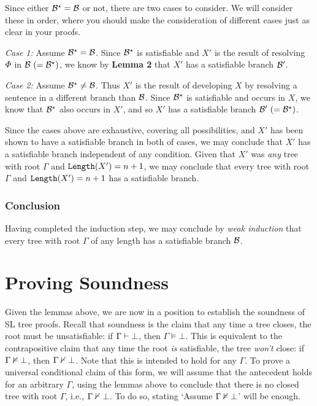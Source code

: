 Since either $\mathcal{B}^\star=\mathcal{B}$ or not, there are two cases to consider.
We will consider these in order, where you should make the consideration of different cases just as clear in your proofs.

\textit{Case 1:} 
  Assume $\mathcal{B}^\star=\mathcal{B}$.
  Since $\mathcal{B}^\star$ is satisfiable and $X'$ is the result of resolving $\varPhi$ in $\mathcal{B}\ (=\mathcal{B}^\star)$, we know by \textbf{Lemma 2} that $X'$ has a satisfiable branch $\mathcal{B}'$. 

\textit{Case 2:} 
  Assume $\mathcal{B}^\star\neq\mathcal{B}$.
  Thus $X'$ is the result of developing $X$ by resolving a sentence in a different branch than $\mathcal{B}$.
  Since $\mathcal{B}^\star$ is satisfiable and occurs in $X$, we know that $\mathcal{B}^\star$ also occurs in $X'$, and so $X'$ has a satisfiable branch $\B'\ (=\B^\star)$.
  
Since the cases above are exhaustive, covering all possibilities, and $X'$ has been shown to have a satisfiable branch in both of cases, we may conclude that $X'$ has a satisfiable branch independent of any condition. 
Given that $X'$ was \textit{any} tree with root $\Gamma$ and $\texttt{Length}(X')=n+1$, we may conclude that every tree with root $\Gamma$ and $\texttt{Length}(X')=n+1$ has a satisfiable branch. 



\subsubsection{Conclusion}

Having completed the induction step, we may conclude by \textit{weak induction} that every tree with root $\Gamma$ of any length has a satisfiable branch $\mathcal{B}$. 


\section{Proving Soundness}

Given the lemmas above, we are now in a position to establish the soundness of SL tree proofs.
Recall that soundness is the claim that any time a tree closes, the root must be unsatisfiable: if $\Gamma \vdash \bot$, then $\Gamma \models \bot$.
This is equivalent to the contrapositive claim that any time the root \emph{is} satisfiable, the tree \emph{won't} close: if $\Gamma \nvDash \bot$, then $\Gamma \nvdash \bot$.
Note that this is intended to hold for any $\Gamma$. 
To prove a universal conditional claim of this form, we will assume that the antecedent holds for an arbitrary $\Gamma$, using the lemmas above to conclude that there is no closed tree with root $\Gamma$, i.e., $\Gamma \nvdash \bot$. 
To do so, stating `Assume $\Gamma \nvDash \bot$' will be enough.

